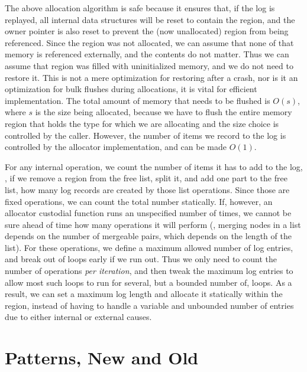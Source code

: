 The above allocation algorithm is safe because it ensures that, if the log is replayed, all internal data structures will
be reset to contain the region, and the owner pointer is also reset to prevent the (now unallocated) region from being
referenced. Since the region was not allocated, we can assume that none of that memory is referenced externally, and the
contents do not matter. Thus we
can assume that region was filled with uninitialized memory, and we do not need to restore it. This
is not a mere optimization for restoring after a crash, nor is it an optimization for bulk flushes during allocations,
it is vital for efficient implementation. The total amount of memory that needs to be flushed is $O(s)$, where $s$ is
the size being allocated, because we have to flush the entire memory region that holds the type for which we are
allocating and the size choice is controlled by the caller. However, the number of items we record to the log is
controlled by the allocator implementation, and can be made $O(1)$.

For any internal operation, we count the number of items it has to add to the log, \eg, if we remove a region from the
free list, split it, and add one part to the free list, how many log records are created by those list operations.
Since those are fixed operations, we can count the total number statically. If, however, an allocator custodial function
runs an unspecified number of times, we cannot be sure ahead of time how many operations it will perform (\eg, merging
nodes in a list depends on the number of mergeable pairs, which depends on the length of the list). For these
operations, we define a maximum allowed number of log entries, and break out of loops early if we run out. Thus we only
need to count the number of operations \emph{per iteration}, and then tweak the maximum log entries to allow most such
loops to run for several, but a bounded number of, loops. As a result, we can set a maximum log length and allocate it
statically within the region, instead of having to handle a variable and unbounded number of entries due to either
internal or external causes.

\iffalse
    \section{Patterns, New and Old}

